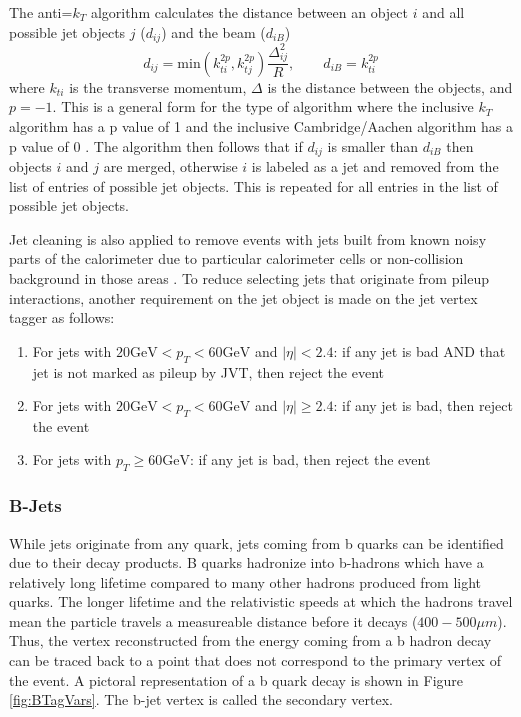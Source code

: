 The anti=$k_T$ algorithm calculates the distance between an object $i$ and all possible jet objects $j$ ($d_{ij}$) and the beam ($d_{iB}$)
\[ d_{ij} = \text{min}(k_{ti}^{2p},k_{tj}^{2p})\frac{\Delta^2_{ij}}{R},\qquad 
d_{iB} = k_{ti}^{2p} \] 
where $k_{ti}$ is the transverse momentum, $\Delta$ is the distance between the objects, and $p=-1$.  This is a general form for the type of algorithm where the inclusive $k_T$ algorithm has a p value of 1 and the inclusive Cambridge/Aachen algorithm has a p value of 0 \cite{CambridgeAachen}.  The algorithm then follows that if $d_{ij}$ is smaller than $d_{iB}$ then objects $i$ and $j$ are merged, otherwise $i$ is labeled as a jet and removed from the list of entries of possible jet objects.  This is repeated for all entries in the list of possible jet objects.

Jet cleaning is also applied to remove events with jets built from known noisy parts of the calorimeter due to particular calorimeter cells or non-collision background in those areas \cite{JetCleaning}.  To reduce selecting jets that originate from pileup interactions, another requirement on the jet object is made on the jet vertex tagger \cite{JetJVT, JetCleanTwiki} as follows:
\begin{enumerate}
\item For jets with $20 \mathrm{ GeV } < p_{T} < 60 \mathrm{ GeV }$ and $|\eta| < 2.4$: if any jet is bad AND that jet is not marked as pileup by JVT, then reject the event
\item For jets with $20 \mathrm{ GeV } < p_{T} < 60 \mathrm{ GeV }$ and $|\eta| \geq 2.4$: if any jet is bad, then reject the event
\item For jets with $p_{T} \geq 60 \mathrm{ GeV }$: if any jet is bad, then reject the event
\end{enumerate}


\subsubsection{B-Jets}

While jets originate from any quark, jets coming from b quarks can be identified due to their decay products.  B quarks hadronize into b-hadrons which have a relatively long lifetime compared to many other hadrons produced from light quarks.  The longer lifetime and the relativistic speeds at which the hadrons travel mean the particle travels a measureable distance before it decays ($400-500 \mu m$)\cite{CMSct}.  Thus, the vertex reconstructed from the energy coming from a b hadron decay can be traced back to a point that does not correspond to the primary vertex of the event.    A pictoral representation of a b quark decay is shown in Figure \ref{fig:BTagVars}.  The b-jet vertex is called the secondary vertex.  

